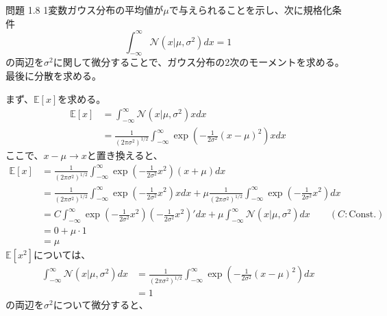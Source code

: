 \documentclass[a4j,dvipdfmx]{jsarticle}
\newcommand{\E}{\mathbb{E}}
\begin{document}
\newpage
\begin{itembox}[l]{問題 1.8}
    1変数ガウス分布の平均値が$\mu$で与えられることを示し、次に規格化条件
    \begin{equation*}
        \int_{-\infty}^{\infty} \mathcal{N}(x|\mu, \sigma^2) dx= 1
    \end{equation*}
    の両辺を$\sigma^2$に関して微分することで、ガウス分布の2次のモーメントを求める。
    最後に分散を求める。
\end{itembox}
まず、$\E[x]$を求める。
\begin{align*}
    \E[x] &= \int_{-\infty}^{\infty} \mathcal{N}(x|\mu, \sigma^2) x dx \\
    &= \frac{1}{(2\pi \sigma^2)^{1/2}} \int_{-\infty}^{\infty}\exp \left( -\frac{1}{2\sigma^2}(x-\mu)^2 \right) x dx
\end{align*}
ここで、$x-\mu \rightarrow x$と置き換えると、
\begin{align*}
    \E[x] &= \frac{1}{(2\pi \sigma^2)^{1/2}} \int_{-\infty}^{\infty}\exp 
    \left( -\frac{1}{2\sigma^2}x^2 \right) (x+\mu) dx \\
    &= \frac{1}{(2\pi \sigma^2)^{1/2}} \int_{-\infty}^{\infty}\exp 
    \left( -\frac{1}{2\sigma^2}x^2 \right) x dx
    + \mu \frac{1}{(2\pi \sigma^2)^{1/2}} \int_{-\infty}^{\infty}\exp 
    \left( -\frac{1}{2\sigma^2}x^2 \right) dx \\
    &= C \int_{-\infty}^{\infty}\exp 
    \left( -\frac{1}{2\sigma^2}x^2 \right) \left( -\frac{1}{2\sigma^2}x^2 \right)' dx
    + \mu \int_{-\infty}^{\infty} \mathcal{N}(x|\mu, \sigma^2) dx \qquad (C:\mathrm{Const.})\\
    &= 0 + \mu \cdot 1 \\
    &= \mu
\end{align*}
$\E[x^2]$については、
\begin{align*}
    \int_{-\infty}^{\infty} \mathcal{N}(x|\mu, \sigma^2) dx
    &= \frac{1}{(2\pi \sigma^2)^{1/2}} \int_{-\infty}^{\infty}\exp \left( -\frac{1}{2\sigma^2}(x-\mu)^2 \right) dx \\
    &= 1
\end{align*}
の両辺を$\sigma^2$について微分すると、
\end{document}
